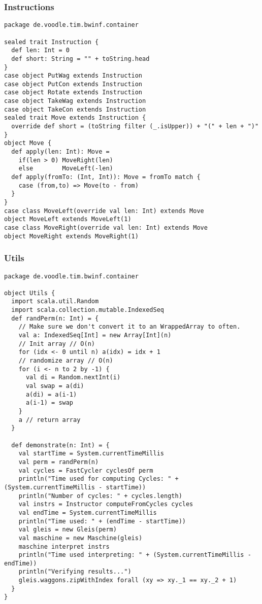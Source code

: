 \subsubsection{Instructions}
\begin{lstlisting}
package de.voodle.tim.bwinf.container

sealed trait Instruction {
  def len: Int = 0
  def short: String = "" + toString.head
}
case object PutWag extends Instruction
case object PutCon extends Instruction
case object Rotate extends Instruction
case object TakeWag extends Instruction
case object TakeCon extends Instruction
sealed trait Move extends Instruction {
  override def short = (toString filter (_.isUpper)) + "(" + len + ")"
}
object Move {
  def apply(len: Int): Move =
    if(len > 0) MoveRight(len)
    else        MoveLeft(-len)
  def apply(fromTo: (Int, Int)): Move = fromTo match {
    case (from,to) => Move(to - from)
  }
}
case class MoveLeft(override val len: Int) extends Move
object MoveLeft extends MoveLeft(1)
case class MoveRight(override val len: Int) extends Move
object MoveRight extends MoveRight(1)
\end{lstlisting}

\subsubsection{Utils}
\begin{lstlisting}
package de.voodle.tim.bwinf.container

object Utils {
  import scala.util.Random
  import scala.collection.mutable.IndexedSeq
  def randPerm(n: Int) = {
    // Make sure we don't convert it to an WrappedArray to often.
    val a: IndexedSeq[Int] = new Array[Int](n)
    // Init array // O(n)
    for (idx <- 0 until n) a(idx) = idx + 1
    // randomize array // O(n)
    for (i <- n to 2 by -1) {
      val di = Random.nextInt(i)
      val swap = a(di)
      a(di) = a(i-1)
      a(i-1) = swap
    }
    a // return array
  }

  def demonstrate(n: Int) = {
    val startTime = System.currentTimeMillis
    val perm = randPerm(n)
    val cycles = FastCycler cyclesOf perm
    println("Time used for computing Cycles: " + (System.currentTimeMillis - startTime))
    println("Number of cycles: " + cycles.length)
    val instrs = Instructor computeFromCycles cycles
    val endTime = System.currentTimeMillis
    println("Time used: " + (endTime - startTime))
    val gleis = new Gleis(perm)
    val maschine = new Maschine(gleis)
    maschine interpret instrs
    println("Time used interpreting: " + (System.currentTimeMillis - endTime))
    println("Verifying results...")
    gleis.waggons.zipWithIndex forall (xy => xy._1 == xy._2 + 1)
  }
}
\end{lstlisting}
\newpage
